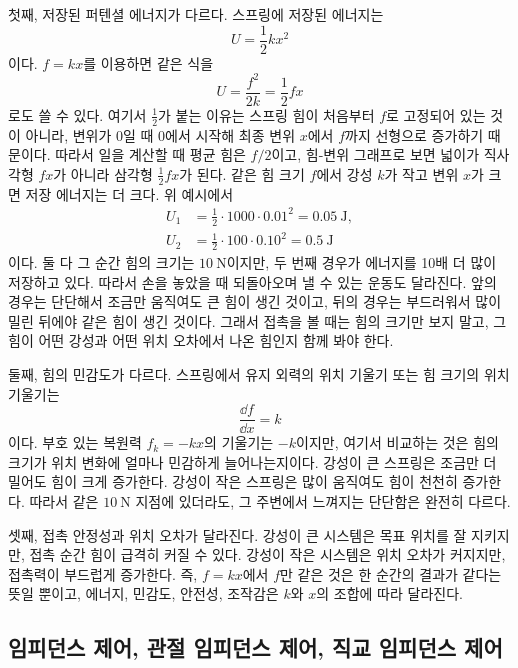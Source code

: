 첫째, 저장된 퍼텐셜 에너지가 다르다.
스프링에 저장된 에너지는
\begin{equation}
  U=\frac{1}{2}kx^2
\end{equation}
이다.
$f=kx$를 이용하면 같은 식을
\begin{equation}
  U=\frac{f^2}{2k}
  =
  \frac{1}{2}fx
\end{equation}
로도 쓸 수 있다.
여기서 $\frac{1}{2}$가 붙는 이유는 스프링 힘이 처음부터 $f$로 고정되어 있는 것이 아니라, 변위가 0일 때 0에서 시작해 최종 변위 $x$에서 $f$까지 선형으로 증가하기 때문이다.
따라서 일을 계산할 때 평균 힘은 $f/2$이고, 힘-변위 그래프로 보면 넓이가 직사각형 $fx$가 아니라 삼각형 $\frac{1}{2}fx$가 된다.
같은 힘 크기 $f$에서 강성 $k$가 작고 변위 $x$가 크면 저장 에너지는 더 크다.
위 예시에서
\begin{align}
  U_1&=\frac{1}{2}\cdot 1000\cdot 0.01^2=0.05~\mathrm{J}, \\
  U_2&=\frac{1}{2}\cdot 100\cdot 0.10^2=0.5~\mathrm{J}
\end{align}
이다.
둘 다 그 순간 힘의 크기는 $10~\mathrm{N}$이지만, 두 번째 경우가 에너지를 10배 더 많이 저장하고 있다.
따라서 손을 놓았을 때 되돌아오며 낼 수 있는 운동도 달라진다.
앞의 경우는 단단해서 조금만 움직여도 큰 힘이 생긴 것이고, 뒤의 경우는 부드러워서 많이 밀린 뒤에야 같은 힘이 생긴 것이다.
그래서 접촉을 볼 때는 힘의 크기만 보지 말고, 그 힘이 어떤 강성과 어떤 위치 오차에서 나온 힘인지 함께 봐야 한다.

둘째, 힘의 민감도가 다르다.
스프링에서 유지 외력의 위치 기울기 또는 힘 크기의 위치 기울기는
\begin{equation}
  \frac{\dd f}{\dd x}=k
\end{equation}
이다.
부호 있는 복원력 $f_k=-kx$의 기울기는 $-k$이지만, 여기서 비교하는 것은 힘의 크기가 위치 변화에 얼마나 민감하게 늘어나는지이다.
강성이 큰 스프링은 조금만 더 밀어도 힘이 크게 증가한다.
강성이 작은 스프링은 많이 움직여도 힘이 천천히 증가한다.
따라서 같은 $10~\mathrm{N}$ 지점에 있더라도, 그 주변에서 느껴지는 단단함은 완전히 다르다.

셋째, 접촉 안정성과 위치 오차가 달라진다.
강성이 큰 시스템은 목표 위치를 잘 지키지만, 접촉 순간 힘이 급격히 커질 수 있다.
강성이 작은 시스템은 위치 오차가 커지지만, 접촉력이 부드럽게 증가한다.
즉, $f=kx$에서 $f$만 같은 것은 한 순간의 결과가 같다는 뜻일 뿐이고, 에너지, 민감도, 안전성, 조작감은 $k$와 $x$의 조합에 따라 달라진다.

\subsection{임피던스 제어, 관절 임피던스 제어, 직교 임피던스 제어}

